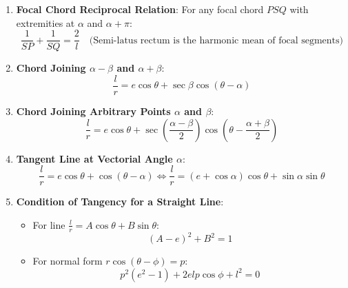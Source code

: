 \begin{theorembox}
\begin{enumerate}
    \item \textbf{Focal Chord Reciprocal Relation}:
    For any focal chord $PSQ$ with extremities at $\alpha$ and $\alpha + \pi$:
    \begin{equation}
        \boxed{\frac{1}{SP} + \frac{1}{SQ} = \frac{2}{l}} \quad \text{(Semi-latus rectum is the harmonic mean of focal segments)}
    \end{equation}
    \item \textbf{Chord Joining $\alpha - \beta$ and $\alpha + \beta$}:
    \begin{equation}
        \boxed{\frac{l}{r} = e\cos\theta + \sec\beta\cos(\theta - \alpha)}
    \end{equation}
    \item \textbf{Chord Joining Arbitrary Points $\alpha$ and $\beta$}:
    \begin{equation}
        \boxed{\frac{l}{r} = e\cos\theta + \sec\left(\frac{\alpha - \beta}{2}\right)\cos\left(\theta - \frac{\alpha + \beta}{2}\right)}
    \end{equation}
    \item \textbf{Tangent Line at Vectorial Angle $\alpha$}:
    \begin{equation}
        \boxed{\frac{l}{r} = e\cos\theta + \cos(\theta - \alpha) \iff \frac{l}{r} = (e + \cos\alpha)\cos\theta + \sin\alpha\sin\theta}
    \end{equation}
    \item \textbf{Condition of Tangency for a Straight Line}:
    \begin{itemize}
        \item For line $\displaystyle \frac{l}{r} = A\cos\theta + B\sin\theta$:
        \begin{equation}
            \boxed{(A - e)^2 + B^2 = 1}
        \end{equation}
        \item For normal form $r\cos(\theta - \phi) = p$:
        \begin{equation}
            \boxed{p^2(e^2 - 1) + 2elp\cos\phi + l^2 = 0}
        \end{equation}
    \end{itemize}
\end{enumerate}
\end{theorembox}

